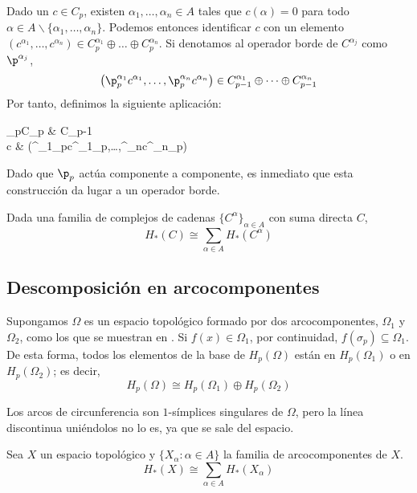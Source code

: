 Dado un $c \in C_p$, existen $\alpha_1,\dots,\alpha_n \in A$ tales que $c(\alpha)=0$ para todo $\alpha \in A\backslash \{\alpha_1,\dots,\alpha_n\}$.
Podemos entonces identificar $c$ con un elemento $(c^{\alpha_1},\dots,c^{\alpha_n}) \in C^{\alpha_1}_p\oplus\dots\oplus C^{\alpha_n}_p$.
Si denotamos al operador borde de $C^{\alpha_j}$ como $\p^{\alpha_j}$,
	\[\left(\p^{\alpha_1}_pc^{\alpha_1},\dots,\p^{\alpha_n}_pc^{\alpha_n}\right) \in C^{\alpha_1}_{p-1}\oplus\dots\oplus C^{\alpha_n}_{p-1}\]
Por tanto, definimos la siguiente aplicación:
	\begin{funcion*}
	\p_p\colon C_p \arrow[r]             & C_{p-1}                   \\
	c \arrow[r, maps to] &
	(\p^{\alpha_1}_pc^{\alpha_1}_p,\dots,\p^{\alpha_n}c^{\alpha_n}_p)
	\end{funcion*}
Dado que $\p_p$ actúa componente a componente, es inmediato que esta construcción da lugar a un operador borde.

\begin{lemma}
	Dada una familia de complejos de cadenas $\{C^\alpha\}_{\alpha \in A}$ con suma directa $C$,
	\[H_*(C)\cong\sum_{\alpha \in A}H_*(C^\alpha)\]
\end{lemma}

\subsection{Descomposición en arcocomponentes}
Supongamos $\Omega$ es un espacio topológico formado por dos arcocomponentes, $\Omega_1$ y $\Omega_2$, como los que se muestran en .
Si $f(x) \in \Omega_1$, por continuidad, $f(\sigma_p) \subseteq \Omega_1$.
De esta forma, todos los elementos de la base de $H_p(\Omega)$ están en $H_p(\Omega_1)$ o en $H_p(\Omega_2)$; es decir,
\[H_p(\Omega)\cong H_p(\Omega_1)\oplus H_p(\Omega_2)\]

\begin{marginfigure}
	
	\caption[Dos espacios arcoconexos.]{Los arcos de circunferencia son $1$-símplices singulares de $\Omega$, pero la línea discontinua uniéndolos no lo es, ya que se sale del espacio.}
\end{marginfigure}

\begin{proposition}
	Sea $X$ un espacio topológico y $\{X_\alpha\colon \alpha\in A\}$ la familia de arcocomponentes de $X$.
		\[H_*(X) \cong \sum_{\alpha \in A} H_*(X_\alpha)\]
\end{proposition}

